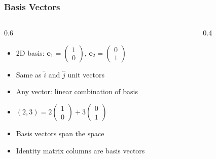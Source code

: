 \begin{frame}[fragile]\frametitle{Basis Vectors}
  \begin{columns}
    \begin{column}[T]{0.6\linewidth}
      \begin{itemize}
        \item 2D basis: $\mathbf{e}_1 = \begin{pmatrix} 1 \\ 0 \end{pmatrix}$, $\mathbf{e}_2 = \begin{pmatrix} 0 \\ 1 \end{pmatrix}$
        \item Same as $\hat{i}$ and $\hat{j}$ unit vectors
        \item Any vector: linear combination of basis
        \item $(2, 3) = 2\begin{pmatrix} 1 \\ 0 \end{pmatrix} + 3\begin{pmatrix} 0 \\ 1 \end{pmatrix}$
        \item Basis vectors span the space
        \item Identity matrix columns are basis vectors
      \end{itemize}
    \end{column}
    \begin{column}[T]{0.4\linewidth}
      \begin{center}
      \end{center}
    \end{column}
  \end{columns}
\end{frame}

